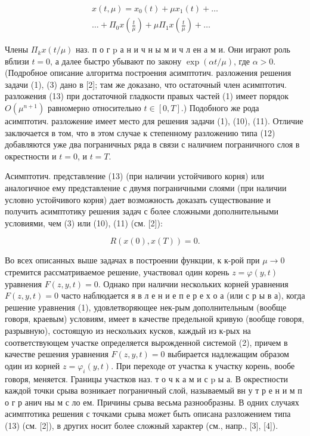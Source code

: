 \documentclass[10pt]{article}
\begin{document}
\[

\begin{gathered}

x(t, \mu)=x_{0}(t)+\mu x_{1}(t)+\ldots \\

\ldots+\Pi_{0} x\left(\frac{t}{\mu}\right)+\mu \Pi_{1} x\left(\frac{t}{\mu}\right)+\ldots

\end{gathered}

\]



Члены $\Pi_{k} x(t / \mu)$ наз. п о г $\mathrm{p}$ а н и ч н ы м и ч л ен а м и. Они играют роль вблизи $t=0$, а далее быстро убывают по закону $\exp (\alpha t / \mu)$, где $\alpha>0$. (Подробное описание алгоритма построения асимптотич. разложения решения задачи (1), (3) дано в [2]; там же доказано, что остаточный член асимптотич. разложения (13) при достаточной гладкости правых частей (1) имеет порядок $O\left(\mu^{n+1}\right)$ равномерно относительно $t \in[0, T]$.) Подобного же рода асимптотич. разложение имеет место для решения задачи (1), (10), (11). Отличие заключается в том, что в этом случае к степенному разложению типа (12) добавляются уже два пограничных ряда в связи с наличием пограничного слоя в окрестности и $t=0$, и $t=T$.



Асимптотич. представление (13) (при наличии устойчивого корня) или аналогичное ему представление с двумя пограничными слоями (при наличии условно устойчивого корня) дает возможность доказать существование и получить асимптотику решения задач с более сложными дополнительными условиями, чем (3) или (10), (11) (см. [2]):



\[

R(x(0), x(T))=0 .

\]



Во всех описанных выше задачах в построении функции, к к-рой при $\mu \rightarrow 0$ стремится рассматриваемое решение, участвовал один корень $z=\varphi(y, t)$ уравнения $F(z, y, t)=0$. Однако при наличии нескольких корней уравнения $F(z, y, t)=0$ часто наблюдается я в л е н и е п е р е х о а (или с р ы в а), когда решение уравнения (1), удовлетворяющее нек-рым дополнительным (вообще говоря, краевым) условиям, имеет в качестве предельной кривую (вообще говоря, разрывную), состоящую из нескольких кусков, каждый из к-рых на соответствующем участке определяется вырожденной системой (2), причем в качестве решения уравнения $F(z, y, t)=0$ выбирается надлежащим образом один из корней $z=\varphi_{i}(y, t)$. При переходе от участка к участку корень, вообе говоря, меняется. Границы участков наз. т о ч к а м и с $\mathrm{p}$ ы а. В окрестности каждой точки срыва возникает пограничный слой, называемый вн у т р е н и м п о г р анич ны м с ло ем. Причины срыва весьма разнообразны. В одних случаях асимптотика решения с точками срыва может быть описана разложением типа (13) (см. [2]), в других носит более сложный характер (см., напр., [3], [4]).
\end{document}

